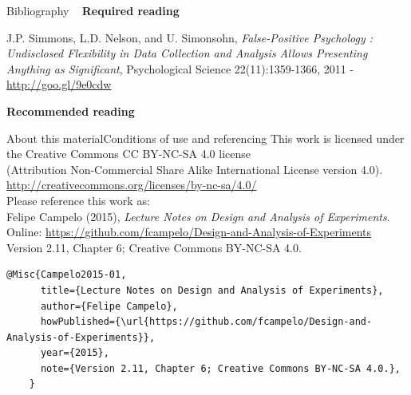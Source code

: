 \documentclass[t]{beamer}
\begin{document}

\begin{ftst}
{Bibliography}
{\ }
\scriptsize
\textbf{Required reading}

\benums 
\item J.P. Simmons, L.D. Nelson, and U. Simonsohn, \textit{False-Positive Psychology : Undisclosed Flexibility in Data Collection and Analysis Allows Presenting Anything as Significant}, Psychological Science 22(11):1359-1366, 2011 - \url{http://goo.gl/9e0cdw}
\eenum

\textbf{Recommended reading}

\benums 
\eenum
\end{ftst}


\begin{ftstf}{About this material}{Conditions of use and referencing}
\centering\footnotesize This work is licensed under the Creative Commons CC BY-NC-SA 4.0 license\\(Attribution Non-Commercial Share Alike International License version 4.0).\\
\vhalf
\url{http://creativecommons.org/licenses/by-nc-sa/4.0/}\\
\vone
\footnotesize Please reference this work as:\\
\footnotesize \flushleft Felipe Campelo (2015), \textit{Lecture Notes on Design and Analysis of Experiments}.\\Online: {\scriptsize\url{https://github.com/fcampelo/Design-and-Analysis-of-Experiments}}\\
Version 2.11, Chapter 6; Creative Commons BY-NC-SA 4.0.\\

\begin{Verbatim}[fontsize=\tiny]
    @Misc{Campelo2015-01,
      title={Lecture Notes on Design and Analysis of Experiments},
      author={Felipe Campelo},
      howPublished={\url{https://github.com/fcampelo/Design-and-Analysis-of-Experiments}},
      year={2015},
      note={Version 2.11, Chapter 6; Creative Commons BY-NC-SA 4.0.},
    }
\end{Verbatim}

\end{ftstf}
\end{document}
